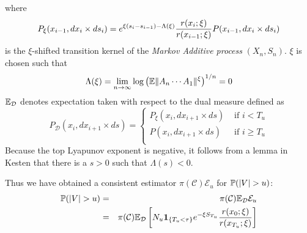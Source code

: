 \documentclass{article}
\begin{document}
where
\[
P_\xi(x_{i-1}, dx_i \times ds_i) = e^{\xi(s_i - s_{i-1}) -
  \Lambda(\xi)} {r(x_i; \xi) \over r(x_{i-1}; \xi)} P(x_{i-1}, dx_i
\times ds_i)
\]
is the $\xi$-shifted transition kernel of the {\it Markov Additive
  process} $(X_n, S_n)$. $\xi$ is chosen such that 
\[
\Lambda(\xi) = \lim_{n \to \infty} \log \left(
\E \|A_n \cdots A_1\|^\xi
\right)^{1/n} = 0
\]
$\E_{\mathcal D}$ denotes expectation taken with respect to the dual
measure defined as
\[
P_{\mathcal D} (x_i, dx_{i+1} \times ds) = \left\{
  \begin{array}{ll}
    P_\xi (x_i, dx_{i+1} \times ds) & \text{ if } i < T_u \\
    P(x_i, dx_{i+1} \times ds) & \text{ if } i \geq T_u \\
  \end{array}
\right.
\]
Because the top Lyapunov exponent is negative, it follows from a lemma
in Kesten \cite{Kesten1973} that there is a $s > 0$ such that
$\Lambda(s) < 0$.

Thus we have obtained a consistent estimator
$\pi(\mathcal C)\mathcal E_u$ for $\P(|V| > u)$:
\begin{eqnarray*}
\P(|V| > u) &=& \pi(\mathcal C) \E_{\mathcal D} \mathcal E_u \\
&=& \pi(\mathcal C) \E_{\mathcal D} \left[
  N_u \1{T_u < \tau} e^{-\xi S_{T_u}} {r(x_0; \xi)
    \over r(x_{T_u}; \xi)}
\right]
\end{eqnarray*}
\end{document}
